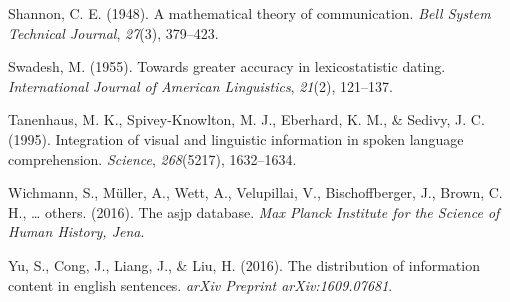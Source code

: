\documentclass[10pt, letterpaper]{article}
\begin{document}
\leavevmode\hypertarget{ref-shannon1948}{}%
Shannon, C. E. (1948). A mathematical theory of communication.
\emph{Bell System Technical Journal}, \emph{27}(3), 379--423.

\leavevmode\hypertarget{ref-swadesh1955}{}%
Swadesh, M. (1955). Towards greater accuracy in lexicostatistic dating.
\emph{International Journal of American Linguistics}, \emph{21}(2),
121--137.

\leavevmode\hypertarget{ref-tanenhaus1995}{}%
Tanenhaus, M. K., Spivey-Knowlton, M. J., Eberhard, K. M., \& Sedivy, J.
C. (1995). Integration of visual and linguistic information in spoken
language comprehension. \emph{Science}, \emph{268}(5217), 1632--1634.

\leavevmode\hypertarget{ref-wichmann2016}{}%
Wichmann, S., Müller, A., Wett, A., Velupillai, V., Bischoffberger, J.,
Brown, C. H., \ldots{} others. (2016). The asjp database. \emph{Max
Planck Institute for the Science of Human History, Jena}.

\leavevmode\hypertarget{ref-yu2016}{}%
Yu, S., Cong, J., Liang, J., \& Liu, H. (2016). The distribution of
information content in english sentences. \emph{arXiv Preprint
arXiv:1609.07681}.


\end{document}
